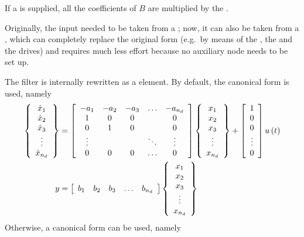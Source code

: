 If a  is supplied, all the coefficients of $ B $
are multiplied by the .

Originally, the input needed to be taken from a ;
now, it can also be taken from a , which can completely replace
the original form (e.g.\ by means of the , the 
and the  drives) and requires much less effort because
no auxiliary node needs to be set up.

The filter is internally rewritten as a  element.
By default, the  canonical form is used, namely
\begin{align*}
	\cubr{\cvvect{
		\dot{x}_1 \\
		\dot{x}_2 \\
		\dot{x}_3 \\
		\vdots \\
		\dot{x}_{n_d}
	}} &= \sqbr{\matr{ccccc}{
		-a_1 & -a_2 & -a_3 & \ldots & -a_{n_d} \\
		1 & 0 & 0 & & 0 \\
		0 & 1 & 0 & & 0 \\
		\vdots & & & \ddots & \vdots \\
		0 & 0 & 0 & \ldots & 0
	}} \cubr{\cvvect{
		x_1 \\
		x_2 \\
		x_3 \\
		\vdots \\
		x_{n_d}
	}} + \sqbr{\cvvect{
		1 \\
		0 \\
		0 \\
		\vdots \\
		0
	}} u\plbr{t} \\
	y &= \sqbr{\matr{ccccc}{
		b_1 & b_2 & b_3 & \ldots & b_{n_d}
	}} \cubr{\cvvect{
		x_1 \\
		x_2 \\
		x_3 \\
		\vdots \\
		x_{n_d}
	}}
\end{align*}
Otherwise, a  canonical form can be used, namely
